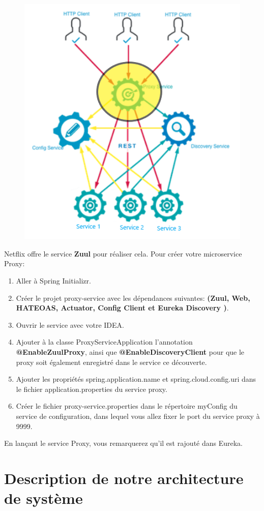     \begin{figure}[H]
    	\centering
    	\includegraphics[width=0.5\linewidth]{images/tp05}
    	\caption{}
    	\label{fig:tp05}
    \end{figure}
    
    Netflix offre le service \textbf{Zuul} pour réaliser cela. Pour créer votre microservice Proxy:
    \begin{enumerate}
\item    Aller à Spring Initializr.
\item     Créer le projet proxy-service avec les dépendances suivantes: \textbf{(Zuul, Web, HATEOAS, Actuator, Config Client et Eureka Discovery )}.
\item     Ouvrir le service avec votre  IDEA.
\item     Ajouter à la classe ProxyServiceApplication l'annotation \textbf{@EnableZuulProxy}, ainsi que \textbf{@EnableDiscoveryClient} pour que le proxy soit également enregistré dans le service ce découverte.
\item     Ajouter les propriétés spring.application.name et spring.cloud.config.uri dans le fichier application.properties du service proxy.
\item     Créer le fichier proxy-service.properties dans le répertoire myConfig du service de configuration, dans lequel vous allez fixer le port du service proxy à 9999.
 \end{enumerate}


En lançant le service Proxy, vous remarquerez qu'il est rajouté dans Eureka.
    
    
    
    
    
    
    
    
    \section{Description de notre architecture de système}
    
